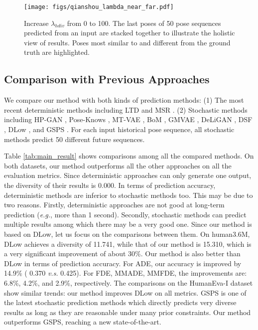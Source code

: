 \documentclass[sigconf,screen,nonacm]{acmart}
\begin{document}
	


	\begin{figure*}[!t]
		\centering
		\texttt{[image: figs/qianshou\_lambda\_near\_far.pdf]}
		\caption{Increase $\lambda_{hdiv}$ from 0 to 100. The last poses of 50 pose sequences predicted from an input are stacked together to illustrate the holistic view of results. Poses most similar to and different from the ground truth are highlighted.}
		\label{fig:qian_shou_guan_yin}
	\end{figure*}
	
	\subsection{Comparison with Previous Approaches}
	
	We compare our method with both kinds of prediction methods: 
(1) The most recent deterministic methods including LTD \cite{mao2019learning} and MSR \cite{dang2021msr}. 
	(2) Stochastic methods including HP-GAN \cite{barsoum2018hp}, Pose-Knows \cite{walker2017pose}, MT-VAE \cite{yan2018mt}, BoM \cite{bhattacharyya2018accurate}, GMVAE \cite{dilokthanakul2016deep}, DeLiGAN \cite{gurumurthy2017deligan}, DSF \cite{yuan2019diverse}, DLow \cite{yuan2020dlow}, and GSPS \cite{mao2021generating}. For each input historical pose sequence, all stochastic methods predict 50 different future sequences.
	
	Table \ref{tab:main_result} shows comparisons among all the compared methods. On both datasets, our method outperforms all the other approaches on all the evaluation metrics. Since deterministic approaches can only generate one output, the diversity of their results is 0.000. In terms of prediction accuracy, deterministic methods are inferior to stochastic methods too. This may be due to two reasons. Firstly, deterministic approaches are not good at long-term prediction (\textit{e.g.}, more than 1 second). Secondly, stochastic methods can predict multiple results among which there may be a very good one. 
	Since our method is based on DLow, let us focus on the comparisons between them. On human3.6M, DLow achieves a diversity of 11.741, while that of our method is 15.310, which is a very significant improvement of about 30\%. Our method is also better than DLow in terms of prediction accuracy. For ADE, our accuracy is improved by 14.9\% ( 0.370 \textit{v.s.} 0.425). For FDE, MMADE, MMFDE, the improvements are: 6.8\%, 4.2\%, and 2.9\%, respectively. The comparisons on the HumanEva-I dataset show similar trends: our method improves DLow on all metrics. GSPS is one of the latest stochastic prediction methods which directly predicts very diverse results as long as they are reasonable under many prior constraints. Our method outperforms GSPS, reaching a new state-of-the-art.
\end{document}
